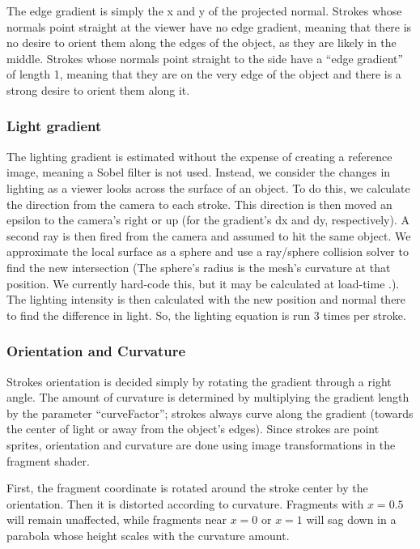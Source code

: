 \documentclass[conference]{acmsiggraph}
\begin{document}
The edge gradient is simply the x and y of the projected normal. Strokes whose
normals point straight at the viewer have no edge gradient, meaning that there
is no desire to orient them along the edges of the object, as they are likely
in the middle. Strokes whose normals point straight to the side have a
``edge gradient'' of length 1, meaning that they are on the very edge of the
object and there is a strong desire to orient them along it.


\subsubsection{Light gradient}

The lighting gradient is estimated without the expense of creating a reference
image, meaning a Sobel filter is not used. Instead, we consider the changes in
lighting as a viewer looks across the surface of an object. To do this, we
calculate the direction from the camera to each stroke. This direction is then
moved an epsilon to the camera's right or up (for the gradient's dx and dy,
respectively). A second ray is then fired from the camera and assumed to hit
the same object. We approximate the local surface as a sphere and use a
ray/sphere collision solver to find the new intersection (The sphere's radius
is the mesh's curvature at that position. We currently hard-code this, but it
may be calculated at load-time \cite{gatzke2006estimating}.). The lighting
intensity is then calculated with the new position and normal there to find
the difference in light. So, the lighting equation is run 3 times per stroke.


\subsubsection{Orientation and Curvature}

Strokes orientation is decided simply by rotating the gradient through a right
angle. The amount of curvature is determined by multiplying the gradient length
by the parameter ``curveFactor''; strokes always curve along the gradient
(towards the center of light or away from the object's edges). Since strokes
are point sprites, orientation and curvature are done using image
transformations in the fragment shader.

First, the fragment coordinate is rotated around the stroke center by the
orientation. Then it is distorted according to curvature. Fragments with
$x = 0.5$ will remain unaffected, while fragments near $x = 0$ or $x = 1$ will
sag down in a parabola whose height scales with the curvature amount.
\end{document}
